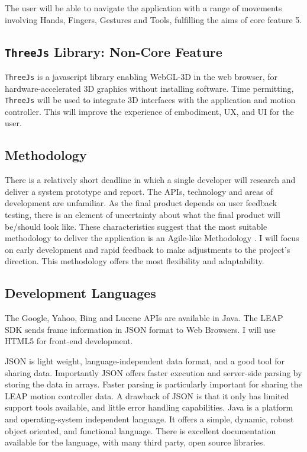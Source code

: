 \documentclass[a4paper, 11pt]{article}
\begin{document}
\begin{justify}
The user will be able to navigate the application with a range of movements involving Hands, Fingers, Gestures and Tools, fulfilling the aims of core feature 5.

\subsection{\texttt{ThreeJs} Library: Non-Core Feature}
\texttt{ThreeJs} is a javascript library enabling WebGL-3D in the web browser, for hardware-accelerated 3D graphics without installing software. Time permitting, \texttt{ThreeJs} will be used to integrate 3D interfaces with the application and motion controller. This will improve the experience of embodiment, UX, and UI for the user.

\subsection{Methodology}
There is a relatively short deadline in which a single developer will research and deliver a system prototype and report. The APIs, technology and areas of development are unfamiliar. As the final product depends on user feedback testing, there is an element of uncertainty about what the final product will be/should look like. These characteristics suggest that the most suitable methodology to deliver the application is an Agile-like Methodology \cite{agile}. I will focus on early development and rapid feedback to make adjustments to the project's direction. This methodology offers the most flexibility and adaptability.


\subsection{Development Languages}
The Google, Yahoo, Bing and Lucene APIs are available in Java. The LEAP SDK sends frame information in JSON format to Web Browsers. I will use HTML5 for front-end development.

JSON is light weight, language-independent data format, and a good tool for sharing data. Importantly JSON offers faster execution and server-side parsing by storing the data in arrays. Faster parsing is particularly important for sharing the LEAP motion controller data. A drawback of JSON is that it only has limited support tools available, and little error handling capabilities. Java is a platform and operating-system independent language. It offers a simple, dynamic, robust object oriented, and functional language. There is excellent documentation available for the language, with many third party, open source libraries.


\end{justify}
\end{document}
